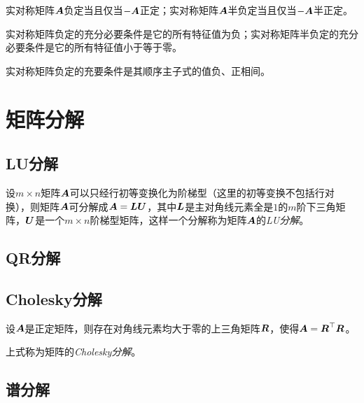 \documentclass{ctexart}
\begin{document}
\begin{theorem}
    实对称矩阵\(\boldsymbol{A}\)负定当且仅当\(-\boldsymbol{A}\)正定；实对称矩阵\(\boldsymbol{A}\)半负定当且仅当\(-\boldsymbol{A}\)半正定。
\end{theorem}

\begin{theorem}
    实对称矩阵负定的充分必要条件是它的所有特征值为负；实对称矩阵半负定的充分必要条件是它的所有特征值小于等于零。
\end{theorem}

\begin{theorem}
    实对称矩阵负定的充要条件是其顺序主子式的值负、正相间。
\end{theorem}

\clearpage

\section{矩阵分解}

\subsection{LU分解}

\begin{theorem}
    设\(m\times n\)矩阵\(\boldsymbol{A}\)可以只经行初等变换化为阶梯型（这里的初等变换不包括行对换），则矩阵\(\boldsymbol{A}\)可分解成\(\boldsymbol{A}=\boldsymbol{L}\boldsymbol{U}\)，其中\(\boldsymbol{L}\)是主对角线元素全是\(1\)的\(m\)阶下三角矩阵，\(\boldsymbol{U}\)是一个\(m\times n\)阶梯型矩阵，这样一个分解称为矩阵\(\boldsymbol{A}\)的\emph{LU分解}。
\end{theorem}

\subsection{QR分解}

\subsection{Cholesky分解}

\begin{theorem}[Cholesky分解]
    设\(\boldsymbol{A}\)是正定矩阵，则存在对角线元素均大于零的上三角矩阵\(\boldsymbol{R}\)，使得\(\boldsymbol{A}=\boldsymbol{R}^\top\boldsymbol{R}\)。

    上式称为矩阵的\emph{Cholesky分解}。
\end{theorem}

\subsection{谱分解}
\end{document}
